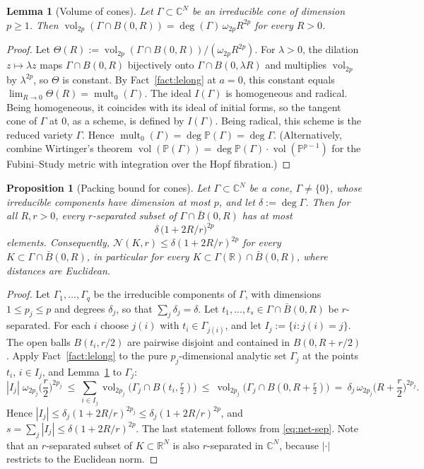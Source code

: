 \documentclass[11pt]{article}
\newtheorem{proposition}[theorem]{Proposition}
\newtheorem{lemma}[theorem]{Lemma}
\theoremstyle{definition}
\numberwithin{equation}{section}
\newcommand{\R}{\mathbb{R}}
\newcommand{\C}{\mathbb{C}}
\newcommand{\PP}{\mathbb{P}}
\newcommand{\cN}{\mathcal{N}}
\DeclareMathOperator{\vol}{vol}
\DeclareMathOperator{\mult}{mult}
\begin{document}
\begin{lemma}[Volume of cones]\label{lem:conevol}
Let $\Gamma\subset\C^N$ be an irreducible cone of dimension $p\ge1$. Then $\vol_{2p}(\Gamma\cap B(0,R))=\deg(\Gamma)\,\omega_{2p}R^{2p}$ for every $R>0$.
\end{lemma}

\begin{proof}
Let $\Theta(R):=\vol_{2p}(\Gamma\cap B(0,R))/(\omega_{2p}R^{2p})$. For $\lambda>0$, the dilation $z\mapsto\lambda z$ maps $\Gamma\cap B(0,R)$ bijectively onto $\Gamma\cap B(0,\lambda R)$ and multiplies $\vol_{2p}$ by $\lambda^{2p}$, so $\Theta$ is constant. By Fact~\ref{fact:lelong} at $a=0$, this constant equals $\lim_{R\to0}\Theta(R)=\mult_0(\Gamma)$. The ideal $I(\Gamma)$ is homogeneous and radical. Being homogeneous, it coincides with its ideal of initial forms, so the tangent cone of $\Gamma$ at $0$, as a scheme, is defined by $I(\Gamma)$. Being radical, this scheme is the reduced variety $\Gamma$. Hence $\mult_0(\Gamma)=\deg\PP(\Gamma)=\deg\Gamma$. (Alternatively, combine Wirtinger's theorem $\vol(\PP(\Gamma))=\deg\PP(\Gamma)\cdot\vol(\PP^{p-1})$ for the Fubini--Study metric \cite{GriffithsHarris} with integration over the Hopf fibration.)
\end{proof}

\begin{proposition}[Packing bound for cones]\label{prop:packing}
Let $\Gamma\subset\C^N$ be a cone, $\Gamma\neq\{0\}$, whose irreducible components have dimension at most $p$, and let $\delta:=\deg\Gamma$. Then for all $R,r>0$, every $r$-separated subset of $\Gamma\cap\bar B(0,R)$ has at most
\[
\delta\,\big(1+2R/r\big)^{2p}
\]
elements. Consequently, $\cN(K,r)\le\delta(1+2R/r)^{2p}$ for every $K\subset\Gamma\cap\bar B(0,R)$, in particular for every $K\subset\Gamma(\R)\cap\bar B(0,R)$, where distances are Euclidean.
\end{proposition}

\begin{proof}
Let $\Gamma_1,\dots,\Gamma_q$ be the irreducible components of $\Gamma$, with dimensions $1\le p_j\le p$ and degrees $\delta_j$, so that $\sum_j\delta_j=\delta$. Let $t_1,\dots,t_s\in\Gamma\cap\bar B(0,R)$ be $r$-separated. For each $i$ choose $j(i)$ with $t_i\in\Gamma_{j(i)}$, and let $I_j:=\{i:j(i)=j\}$. The open balls $B(t_i,r/2)$ are pairwise disjoint and contained in $B(0,R+r/2)$. Apply Fact~\ref{fact:lelong} to the pure $p_j$-dimensional analytic set $\Gamma_j$ at the points $t_i$, $i\in I_j$, and Lemma~\ref{lem:conevol} to $\Gamma_j$:
\[
|I_j|\;\omega_{2p_j}\Big(\frac r2\Big)^{2p_j}\ \le\ \sum_{i\in I_j}\vol_{2p_j}\big(\Gamma_j\cap B(t_i,\tfrac r2)\big)\ \le\ \vol_{2p_j}\big(\Gamma_j\cap B(0,R+\tfrac r2)\big)\ =\ \delta_j\,\omega_{2p_j}\Big(R+\frac r2\Big)^{2p_j}.
\]
Hence $|I_j|\le\delta_j(1+2R/r)^{2p_j}\le\delta_j(1+2R/r)^{2p}$, and $s=\sum_j|I_j|\le\delta(1+2R/r)^{2p}$. The last statement follows from \eqref{eq:net-sep}. Note that an $r$-separated subset of $K\subset\R^N$ is also $r$-separated in $\C^N$, because $|\cdot|$ restricts to the Euclidean norm.
\end{proof}
\end{document}
